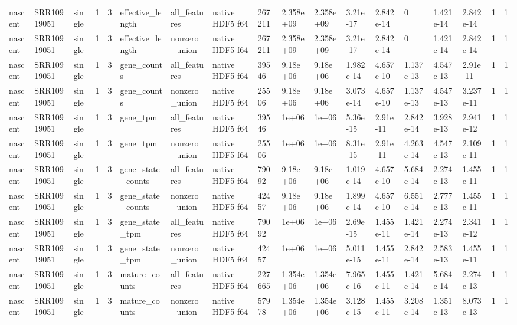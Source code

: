 \begin{tabular}{llllllllllllllllll}
nascent & SRR10919051 & single & 1 & 3 & effective\_length & all\_features & native HDF5 f64 & 267211 & 2.358e+09 & 2.358e+09 & 3.21e-17 & 2.842e-14 & 0 & 1.421e-14 & 2.842e-14 & 1 & 1 \\
nascent & SRR10919051 & single & 1 & 3 & effective\_length & nonzero\_union & native HDF5 f64 & 267211 & 2.358e+09 & 2.358e+09 & 3.21e-17 & 2.842e-14 & 0 & 1.421e-14 & 2.842e-14 & 1 & 1 \\
nascent & SRR10919051 & single & 1 & 3 & gene\_counts & all\_features & native HDF5 f64 & 39546 & 9.18e+06 & 9.18e+06 & 1.982e-14 & 4.657e-10 & 1.137e-13 & 4.547e-13 & 2.91e-11 & 1 & 1 \\
nascent & SRR10919051 & single & 1 & 3 & gene\_counts & nonzero\_union & native HDF5 f64 & 25506 & 9.18e+06 & 9.18e+06 & 3.073e-14 & 4.657e-10 & 1.137e-13 & 4.547e-13 & 3.237e-11 & 1 & 1 \\
nascent & SRR10919051 & single & 1 & 3 & gene\_tpm & all\_features & native HDF5 f64 & 39546 & 1e+06 & 1e+06 & 5.36e-15 & 2.91e-11 & 2.842e-14 & 3.928e-13 & 2.941e-12 & 1 & 1 \\
nascent & SRR10919051 & single & 1 & 3 & gene\_tpm & nonzero\_union & native HDF5 f64 & 25506 & 1e+06 & 1e+06 & 8.31e-15 & 2.91e-11 & 4.263e-14 & 4.547e-13 & 2.109e-11 & 1 & 1 \\
nascent & SRR10919051 & single & 1 & 3 & gene\_state\_counts & all\_features & native HDF5 f64 & 79092 & 9.18e+06 & 9.18e+06 & 1.019e-14 & 4.657e-10 & 5.684e-14 & 2.274e-13 & 1.455e-11 & 1 & 1 \\
nascent & SRR10919051 & single & 1 & 3 & gene\_state\_counts & nonzero\_union & native HDF5 f64 & 42457 & 9.18e+06 & 9.18e+06 & 1.899e-14 & 4.657e-10 & 6.551e-14 & 2.777e-13 & 1.455e-11 & 1 & 1 \\
nascent & SRR10919051 & single & 1 & 3 & gene\_state\_tpm & all\_features & native HDF5 f64 & 79092 & 1e+06 & 1e+06 & 2.69e-15 & 1.455e-11 & 1.421e-14 & 2.274e-13 & 2.341e-12 & 1 & 1 \\
nascent & SRR10919051 & single & 1 & 3 & gene\_state\_tpm & nonzero\_union & native HDF5 f64 & 42457 & 1e+06 & 1e+06 & 5.011e-15 & 1.455e-11 & 2.842e-14 & 2.583e-13 & 1.455e-11 & 1 & 1 \\
nascent & SRR10919051 & single & 1 & 3 & mature\_counts & all\_features & native HDF5 f64 & 227665 & 1.354e+06 & 1.354e+06 & 7.965e-16 & 1.455e-11 & 1.421e-14 & 5.684e-14 & 2.274e-13 & 1 & 1 \\
nascent & SRR10919051 & single & 1 & 3 & mature\_counts & nonzero\_union & native HDF5 f64 & 57978 & 1.354e+06 & 1.354e+06 & 3.128e-15 & 1.455e-11 & 3.208e-14 & 1.351e-13 & 8.073e-13 & 1 & 1 \\

\end{tabular}
